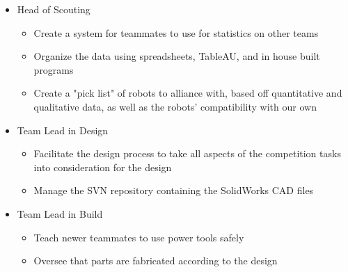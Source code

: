 \documentclass[]{friggeri-cv} %
\begin{document}
\begin{entrylist}
{\begin{itemize}
\begin{itemize}
\item Run system checks to ensure robot communicates with computer and controllers prior to a match 
\item Create vision systems for the robot drivers 
\end{itemize}
\item Head of Scouting 
\begin{itemize}
\item Create a system for teammates to use for statistics on other teams 
\item Organize the data using spreadsheets, TableAU, and in house built programs 
\item Create a "pick list" of robots to alliance with, based off quantitative and qualitative data, as well as the robots' compatibility with our own 
\end{itemize}
\item Team Lead in Design 
\begin{itemize}
\item Facilitate the design process to take all aspects of the competition tasks into consideration for the design 
\item Manage the SVN repository containing the SolidWorks CAD files 
\end{itemize}
\item Team Lead in Build 
\begin{itemize}
\item Teach newer teammates to use power tools safely 
\item Oversee that parts are fabricated according to the design 
\end{itemize}
\end{itemize}
}



\end{entrylist}
\end{document}

